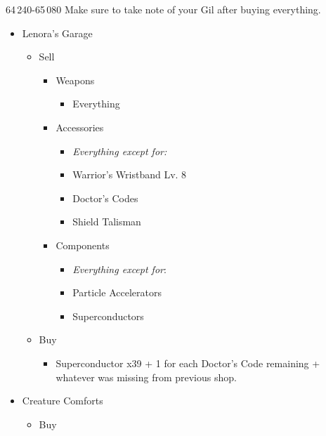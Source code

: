 	\begin{shop}{64\,240-65\,080}
		Make sure to take note of your Gil after buying everything.
		\begin{itemize}
			\item Lenora's Garage
			      \begin{itemize}
				      \item Sell
				            \begin{itemize}
					            \item Weapons
					                  \begin{itemize}
						                  \item Everything
					                  \end{itemize}
					            \item Accessories
					                  \begin{itemize}
						                  \item \textit{Everything except for:}
						                  \item Warrior's Wristband Lv. 8
						                  \item Doctor's Codes
						                  \item Shield Talisman
					                  \end{itemize}
					            \item Components
					                  \begin{itemize}
						                  \item \textit{Everything except for}:
						                  \item Particle Accelerators
						                  \item Superconductors
					                  \end{itemize}
				            \end{itemize}
				      \item Buy
				            \begin{itemize}
					            \item Superconductor x39 + 1 for each Doctor's Code remaining + whatever was missing from previous shop.
				            \end{itemize}
			      \end{itemize}
			\item Creature Comforts
			      \begin{itemize}
				      \item Buy
				            \begin{itemize}

\end{itemize}
\end{itemize}
\end{itemize}
\end{shop}

